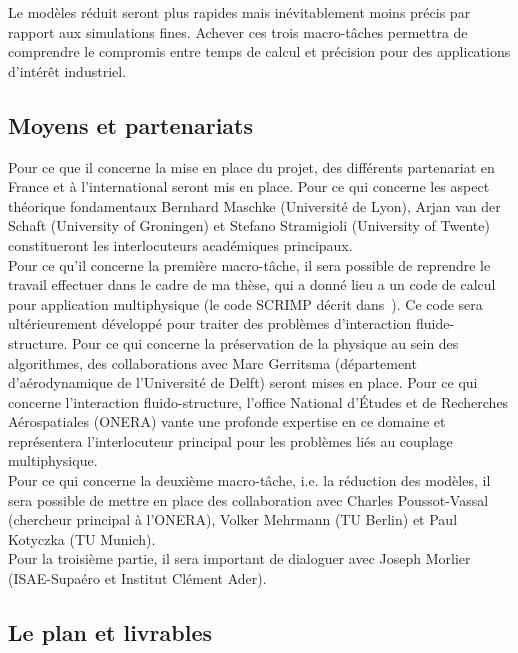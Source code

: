 \documentclass[french]{article}
\begin{document}
Le modèles réduit seront plus rapides mais inévitablement moins précis par rapport aux simulations fines. Achever ces trois macro-tâches permettra de comprendre le compromis entre temps de calcul et précision pour des applications d'intérêt industriel. 

\subsection{Moyens et partenariats}
Pour ce que il concerne la mise en place du projet, des différents partenariat en France et \`a l'international seront mis en place. Pour ce qui concerne les aspect théorique fondamentaux Bernhard Maschke (Universit\'e de Lyon), Arjan van der Schaft (University of Groningen) et Stefano Stramigioli (University of Twente) constitueront les interlocuteurs académiques principaux. \\

Pour ce qu'il concerne la première macro-tâche, il sera possible de reprendre le travail effectuer dans le cadre de ma thèse, qui a donn\'e lieu a un code de calcul pour application multiphysique (le code SCRIMP décrit dans~\cite{brugnoli2021num}). Ce code sera ultérieurement développé pour traiter des problèmes d'interaction fluide-structure. Pour ce qui concerne la préservation de la physique au sein des algorithmes, des collaborations avec Marc Gerritsma (département d'aérodynamique de l'Universit\'e de Delft) seront mises en place. Pour ce qui concerne l'interaction fluido-structure, l'office National d'Études et de Recherches Aérospatiales (ONERA) vante une profonde expertise en ce domaine et représentera l'interlocuteur principal pour les problèmes liés au couplage multiphysique. 
\\


Pour ce qui concerne la deuxième macro-tâche, i.e. la réduction des modèles, il sera possible de mettre en place des collaboration avec Charles Poussot-Vassal (chercheur principal \`a l'ONERA),  Volker Mehrmann (TU Berlin) et Paul Kotyczka (TU Munich). \\
 
Pour la troisième partie, il sera important de dialoguer avec Joseph Morlier (ISAE-Supa\'ero et Institut Clément Ader).
 

\subsection{Le plan et livrables}
\end{document}
